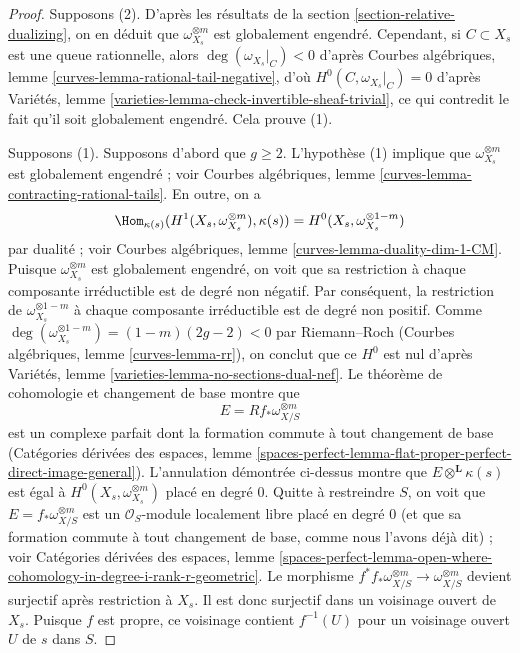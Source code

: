 \begin{proof}
Supposons (2). D'après les résultats de la section \ref{section-relative-dualizing},
on en déduit que $\omega_{X_s}^{\otimes m}$ est
globalement engendré. Cependant, si $C \subset X_s$
est une queue rationnelle, alors $\deg(\omega_{X_s}|_C) < 0$ d'après
Courbes algébriques, lemme \ref{curves-lemma-rational-tail-negative},
d'où $H^0(C, \omega_{X_s}|_C) = 0$ d'après
Variétés, lemme \ref{varieties-lemma-check-invertible-sheaf-trivial},
ce qui contredit le fait qu'il soit globalement engendré.
Cela prouve (1).

\medskip\noindent
Supposons (1). Supposons d'abord que $g \geq 2$. L'hypothèse (1)
implique que $\omega_{X_s}^{\otimes m}$ est globalement engendré ;
voir Courbes algébriques, lemme \ref{curves-lemma-contracting-rational-tails}.
En outre, on a
$$
\Hom_{\kappa(s)}(H^1(X_s, \omega_{X_s}^{\otimes m}), \kappa(s)) =
H^0(X_s, \omega_{X_s}^{\otimes 1 - m})
$$
par dualité ; voir Courbes algébriques, lemme \ref{curves-lemma-duality-dim-1-CM}.
Puisque $\omega_{X_s}^{\otimes m}$ est globalement engendré, on voit
que sa restriction à chaque composante irréductible est de degré non négatif.
Par conséquent, la restriction de $\omega_{X_s}^{\otimes 1 - m}$ à chaque
composante irréductible est de degré non positif. Comme
$\deg(\omega_{X_s}^{\otimes 1 - m}) = (1 - m)(2g - 2) < 0$ par Riemann--Roch
(Courbes algébriques, lemme \ref{curves-lemma-rr}), on conclut que ce $H^0$
est nul d'après Variétés, lemme \ref{varieties-lemma-no-sections-dual-nef}.
Le théorème de cohomologie et changement de base montre que
$$
E = Rf_*\omega_{X/S}^{\otimes m}
$$
est un complexe parfait dont la formation commute à tout changement de base
(Catégories dérivées des espaces, lemme
\ref{spaces-perfect-lemma-flat-proper-perfect-direct-image-general}).
L'annulation démontrée ci-dessus montre que $E \otimes^\mathbf{L} \kappa(s)$
est égal à $H^0(X_s, \omega_{X_s}^{\otimes m})$ placé en degré $0$.
Quitte à restreindre $S$, on voit que $E = f_*\omega_{X/S}^{\otimes m}$
est un $\mathcal{O}_S$-module localement libre placé en degré $0$
(et que sa formation commute à tout changement de base, comme nous
l'avons déjà dit) ; voir Catégories dérivées des espaces, lemme
\ref{spaces-perfect-lemma-open-where-cohomology-in-degree-i-rank-r-geometric}.
Le morphisme $f^*f_*\omega_{X/S}^{\otimes m} \to \omega_{X/S}^{\otimes m}$
devient surjectif après restriction à $X_s$. Il est donc surjectif dans
un voisinage ouvert de $X_s$. Puisque $f$ est propre, ce voisinage
contient $f^{-1}(U)$ pour un voisinage ouvert
$U$ de $s$ dans $S$.


\end{proof}
